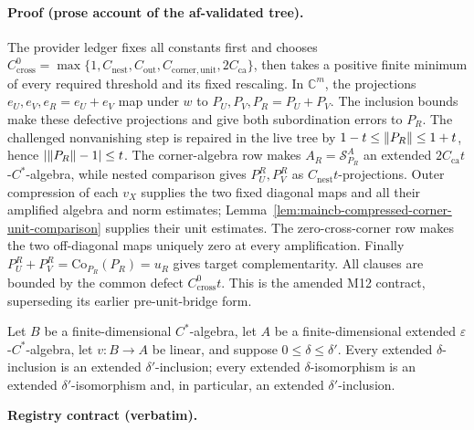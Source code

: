 \paragraph{Proof (prose account of the af-validated tree).}
The provider ledger fixes all constants first and chooses
$C^0_{\mathrm{cross}}=\max\{1,C_{\mathrm{nest}},C_{\mathrm{out}},
C_{\mathrm{corner,unit}},2C_{\mathrm{ca}}\}$, then takes a positive finite minimum
of every required threshold and its fixed rescaling.  In $\mathbb C^m$, the projections
$e_U,e_V,e_R=e_U+e_V$ map under $w$ to $P_U,P_V,P_R=P_U+P_V$.
The inclusion bounds make these defective projections and give both subordination
errors to $P_R$.  The challenged nonvanishing step is repaired in the live tree by
$1-t\le\lVert P_R\rVert\le1+t$, hence $|\lVert P_R\rVert-1|\le t$.
The corner-algebra row makes $A_R=\mathcal S^A_{P_R}$ an extended
$2C_{\mathrm{ca}}t$-$C^*$-algebra, while nested comparison gives
$P_U^R,P_V^R$ as $C_{\mathrm{nest}}t$-projections.  Outer compression of each
$v_X$ supplies the two fixed diagonal maps and all their amplified algebra and norm
estimates; Lemma~\ref{lem:maincb-compressed-corner-unit-comparison} supplies their
unit estimates.  The zero-cross-corner row makes the two off-diagonal maps uniquely zero
at every amplification.  Finally $P_U^R+P_V^R=\mathrm{Co}_{P_R}(P_R)=u_R$ gives target
complementarity.  All clauses are bounded by the common defect $C^0_{\mathrm{cross}}t$.
This is the amended M12 contract, superseding its earlier pre-unit-bridge form.

\begin{lemma}\label{lem:maincb-extended-inclusion-monotone}
Let $B$ be a finite-dimensional $C^*$-algebra, let $A$ be a finite-dimensional
extended $\varepsilon$-$C^*$-algebra, let $v:B\to A$ be linear, and suppose
$0\le\delta\le\delta'$.  Every extended $\delta$-inclusion is an extended
$\delta'$-inclusion; every extended $\delta$-isomorphism is an extended
$\delta'$-isomorphism and, in particular, an extended $\delta'$-inclusion.
\end{lemma}
\noindent\textbf{Registry contract (verbatim).}
